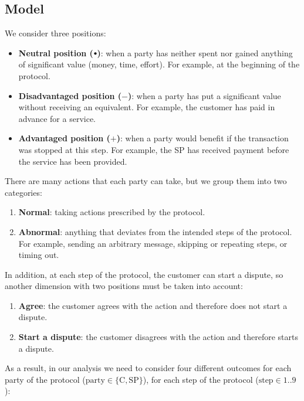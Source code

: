 \documentclass[pdftex,twocolumn,epjc3]{svjour3}
\newcommand{\plus}{+}
\newcommand{\minus}{-}
\newcommand\neutral[1][.75]{\mathbin{\ThisStyle{\vcenter{\hbox{%
  \scalebox{#1}{$\SavedStyle\bullet$}}}}}%
}
\begin{document}
{\subsection{Model}\label{sec:fairness-model}
We consider three positions:

\begin{itemize}
\item \textbf{Neutral position ($\neutral{}$)}: when a party has neither spent nor gained anything of significant value (money, time, effort). For example, at the beginning of the protocol.
\item \textbf{Disadvantaged position ($\minus{}$)}: when a party has put a significant value without receiving an equivalent. For example, the customer has paid in advance for a service.
\item \textbf{Advantaged position ($\plus{}$)}: when a party would benefit if the transaction was stopped at this step. For example, the SP has received payment before the service has been provided.
\end{itemize}

There are many actions that each party can take, but we group them into two categories:


\begin{enumerate}
\def\labelenumi{\arabic{enumi}.}

\item \textbf{Normal}: taking actions prescribed by the protocol.
\item \textbf{Abnormal}: anything that deviates from the intended steps of the protocol. For example, sending an arbitrary message, skipping or repeating steps, or timing out.
\end{enumerate}

In addition, at each step of the protocol, the customer can start a dispute, so another dimension with two positions must be taken into account:

\begin{enumerate}
\def\labelenumi{\arabic{enumi}.}

\item \textbf{Agree}: the customer agrees with the action and therefore does not start a dispute.
\item \textbf{Start a dispute}: the customer disagrees with the action and therefore starts a dispute.
\end{enumerate}

As a result, in our analysis we need to consider four different outcomes for each party of the protocol ($\mathrm{party \in \{C, SP}\}$), for each step of the protocol ($\mathrm{step \in 1..9}$):

}
\end{document}
